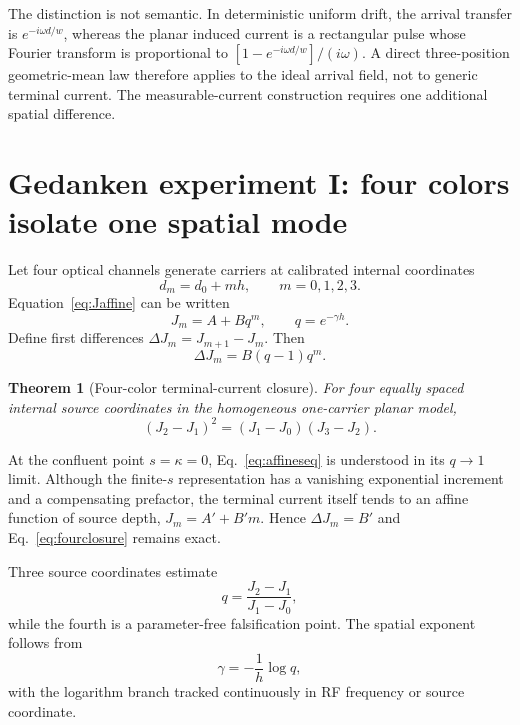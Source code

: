 \documentclass[11pt]{article}
\newtheorem{theorem}{Theorem}
\begin{document}
The distinction is not semantic. In deterministic uniform drift, the arrival transfer is $e^{-i\omega d/w}$, whereas the planar induced current is a rectangular pulse whose Fourier transform is proportional to $[1-e^{-i\omega d/w}]/(i\omega)$. A direct three-position geometric-mean law therefore applies to the ideal arrival field, not to generic terminal current. The measurable-current construction requires one additional spatial difference.

\section{Gedanken experiment I: four colors isolate one spatial mode}

Let four optical channels generate carriers at calibrated internal coordinates
\begin{equation}
d_m=d_0+mh,
\qquad m=0,1,2,3.
\label{eq:fourcoords}
\end{equation}
Equation~\eqref{eq:Jaffine} can be written
\begin{equation}
J_m=A+Bq^m,
\qquad q=e^{-\gamma h}.
\label{eq:affineseq}
\end{equation}
Define first differences $\Delta J_m=J_{m+1}-J_m$. Then
\begin{equation}
\Delta J_m=B(q-1)q^m.
\label{eq:firstdiff}
\end{equation}

\begin{theorem}[Four-color terminal-current closure]
For four equally spaced internal source coordinates in the homogeneous one-carrier planar model,
\begin{equation}
\boxed{(J_2-J_1)^2=(J_1-J_0)(J_3-J_2).}
\label{eq:fourclosure}
\end{equation}
\end{theorem}

At the confluent point $s=\kappa=0$, Eq.~\eqref{eq:affineseq} is understood in its $q\to1$ limit. Although the finite-$s$ representation has a vanishing exponential increment and a compensating prefactor, the terminal current itself tends to an affine function of source depth, $J_m=A'+B'm$. Hence $\Delta J_m=B'$ and Eq.~\eqref{eq:fourclosure} remains exact.

Three source coordinates estimate
\begin{equation}
\boxed{q=\frac{J_2-J_1}{J_1-J_0},}
\label{eq:qrecover}
\end{equation}
while the fourth is a parameter-free falsification point. The spatial exponent follows from
\begin{equation}
\boxed{\gamma=-\frac{1}{h}\log q,}
\label{eq:grecover}
\end{equation}
with the logarithm branch tracked continuously in RF frequency or source coordinate.
\end{document}
